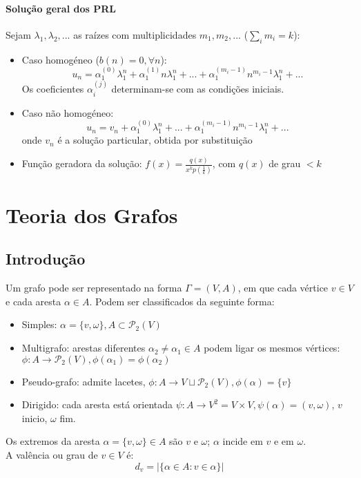 \documentclass[10pt,a4paper]{report}
\begin{document}
\subsubsection{Solução geral dos PRL}
Sejam $\lambda_1, \lambda_2, ...$ as raízes com multiplicidades $m_1, m_2, ...$ ($\textstyle \sum_i m_i = k$):
\begin{itemize}
\item Caso homogéneo ($b(n) = 0,  \forall n$):
$$
u_n = \alpha_1^{(0)} \lambda_1^n + \alpha_1^{(1)} n\lambda_1^n + ... + \alpha_1^{(m_i - 1)} n^{m_i - 1} \lambda_1^n + ...
$$
Os coeficientes $\alpha_i^{(j)}$ determinam-se com as condições iniciais.
\item Caso não homogéneo:
$$
u_n = v_n + \alpha_1^{(0)} \lambda_1^n + ... + \alpha_1^{(m_i - 1)} n^{m_i - 1} \lambda_1^n + ...
$$
onde $v_n$ é a solução particular, obtida por substituição
\item Função geradora da solução: $f(x) = \frac{q(x)}{x^kp\left(\frac{1}{k}\right)}$, com $q(x)$ de grau $< k$
\end{itemize}

\chapter{Teoria dos Grafos}
\section{Introdução}
Um grafo pode ser representado na forma $\Gamma = (V,A)$, em que cada vértice $v \in V$ e cada aresta $\alpha \in A$. Podem ser classificados da seguinte forma:
\begin{itemize}
\item Simples: $\alpha = \{v, \omega\}, A \subset \mathcal{P}_2(V)$
\item Multigrafo: arestas diferentes $\alpha_2 \neq \alpha_1 \in A$ podem ligar os mesmos vértices: $\phi : A \rightarrow \mathcal{P}_2(V), \phi(\alpha_1) = \phi(\alpha_2)$
\item Pseudo-grafo: admite lacetes, $\phi : A \rightarrow V \sqcup \mathcal{P}_2(V), \phi(\alpha) = \{v\}$
\item Dirigido: cada aresta está orientada $\psi : A \rightarrow V^2 = V \times V, \psi(\alpha) = (v, \omega)$, $v$ inicio, $\omega$ fim.
\end{itemize}
Os extremos da aresta $\alpha = \{v, \omega\} \in A$ são $v$ e $\omega$; $\alpha$ incide em $v$ e em $\omega$.\\
A valência ou grau de $v \in V$ é:
$$
d_v = |\{ \alpha \in A : v \in \alpha\}|
$$
\end{document}

